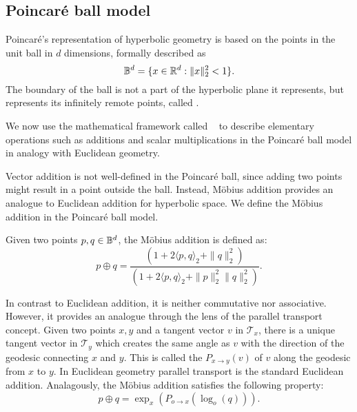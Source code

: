 \subsection{Poincaré ball model}\label{sec:poincareBall}
Poincaré's representation of hyperbolic geometry is based on the points in the unit ball in $d$ dimensions, formally described as
\begin{equation*}
    \mathbb{B}^d = \{x \in \mathbb{R}^d: \|x\|^2_2 < 1\}.
\end{equation*}
The boundary of the ball is not a part of the hyperbolic plane it represents, but represents its infinitely remote points, called .

We now use the mathematical framework called ~\cite{ungar2022gyrovectorSpaceHyperbolicGeometry}\cite{Ungar1999HyperbolicPythagoreanTheoremPoincareDiscModel} to describe elementary operations such as additions and scalar multiplications in the Poincaré ball model in analogy with Euclidean geometry.

Vector addition is not well-defined in the Poincaré ball, since adding two points might result in a point outside the ball. Instead, Möbius addition provides an analogue to Euclidean addition for hyperbolic space. We define the Möbius addition in the Poincaré ball model.

\begin{definition}
    Given two points $p,q\in\mathbb{B}^d$, the Möbius addition is defined as:
    \begin{equation*}
        p \oplus q = \frac{(1 +  2\langle p,q\rangle_2 + \|q\|^2_2)}{(1 + 2\langle p,q\rangle_2 + \|p\|^2_2\|q\|^2_2)}.
    \end{equation*}
    
\end{definition}

In contrast to Euclidean addition, it is neither commutative nor associative. However, it provides an analogue through the lens of the parallel transport concept. Given two points $x,y$ and a tangent vector $v$ in $\mathcal{T}_x$, there is a unique tangent vector in $\mathcal{T}_y$ which creates the same angle as $v$ with the direction of the geodesic connecting $x$ and $y$. This is called the  $P_{x\to y} (v)$ of $v$ along the geodesic from $x$ to $y$. In Euclidean geometry parallel transport is the standard Euclidean addition. Analagously, the Möbius addition satisfies the following property:
\begin{equation*}
    p\oplus q=\exp_{x}(P_{o\to x}(\log_o(q))).
\end{equation*}

